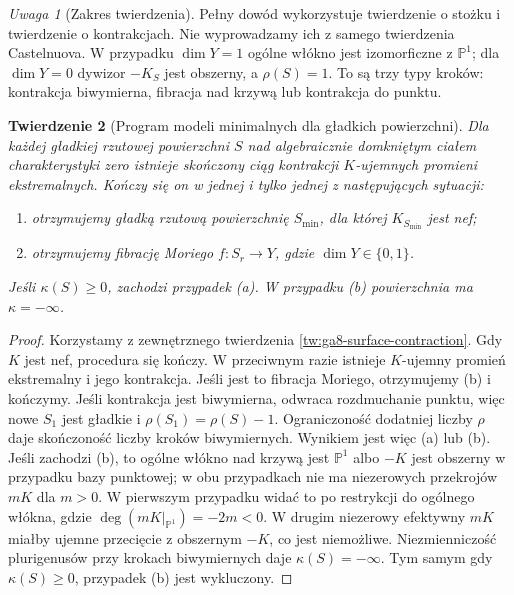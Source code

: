 \documentclass[11pt,a4paper,openany]{report}
\numberwithin{equation}{section}
\theoremstyle{plain}
\newtheorem{twierdzenie}{Twierdzenie}[section]
\theoremstyle{definition}
\theoremstyle{remark}
\newtheorem{uwaga}[twierdzenie]{Uwaga}
\newcommand{\PP}{\mathbb P}
\begin{document}
\begin{uwaga}[Zakres twierdzenia]
Pełny dowód wykorzystuje twierdzenie o stożku i twierdzenie
o kontrakcjach. Nie wyprowadzamy ich z samego twierdzenia
Castelnuova. W przypadku $\dim Y=1$ ogólne włókno
jest izomorficzne z $\PP^1$; dla $\dim Y=0$ dywizor
$-K_S$ jest obszerny, a $\rho(S)=1$.
To są trzy typy kroków: kontrakcja biwymierna,
fibracja nad krzywą lub kontrakcja do punktu.
\end{uwaga}

\begin{twierdzenie}[Program modeli minimalnych dla gładkich powierzchni]
\label{tw:ga8-surface-mmp}
Dla każdej gładkiej rzutowej powierzchni $S$
nad algebraicznie domkniętym ciałem charakterystyki zero
istnieje skończony ciąg kontrakcji $K$-ujemnych
promieni ekstremalnych. Kończy się on w jednej
i tylko jednej z następujących sytuacji:
\begin{enumerate}[label=(\alph*)]
\item otrzymujemy gładką rzutową powierzchnię $S_{\min}$,
dla której $K_{S_{\min}}$ jest nef;
\item otrzymujemy fibrację Moriego $f:S_r\to Y$,
gdzie $\dim Y\in\{0,1\}$.
\end{enumerate}
Jeśli $\kappa(S)\ge0$, zachodzi przypadek (a).
W przypadku (b) powierzchnia ma $\kappa=-\infty$.
\end{twierdzenie}
\begin{proof}
Korzystamy z zewnętrznego twierdzenia
\ref{tw:ga8-surface-contraction}. Gdy $K$ jest nef,
procedura się kończy. W przeciwnym razie istnieje
$K$-ujemny promień ekstremalny i jego kontrakcja.
Jeśli jest to fibracja Moriego, otrzymujemy (b)
i kończymy. Jeśli kontrakcja jest biwymierna,
odwraca rozdmuchanie punktu, więc nowe $S_1$
jest gładkie i $\rho(S_1)=\rho(S)-1$.
Ograniczoność dodatniej liczby $\rho$ daje skończoność
liczby kroków biwymiernych. Wynikiem jest więc
(a) lub (b). Jeśli zachodzi (b), to ogólne włókno
nad krzywą jest $\PP^1$ albo $-K$ jest obszerny
w przypadku bazy punktowej; w obu przypadkach
nie ma niezerowych przekrojów $mK$ dla $m>0$.
W pierwszym przypadku widać to po restrykcji
do ogólnego włókna, gdzie
$\deg(mK|_{\PP^1})=-2m<0$.
W drugim niezerowy efektywny $mK$ miałby
ujemne przecięcie z obszernym $-K$, co jest
niemożliwe. Niezmienniczość plurigenusów przy
krokach biwymiernych daje $\kappa(S)=-\infty$.
Tym samym gdy $\kappa(S)\ge0$, przypadek (b)
jest wykluczony.
\end{proof}
\end{document}
